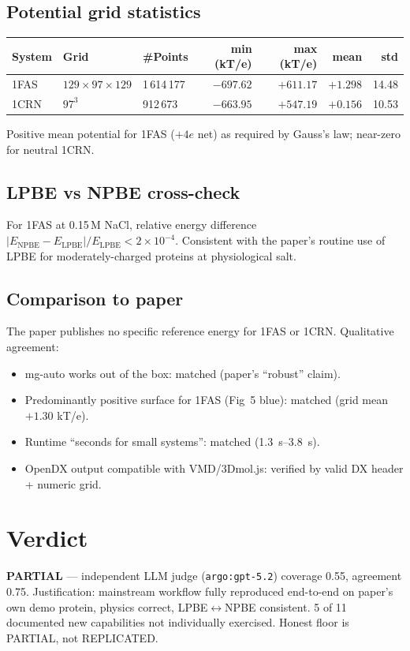 \documentclass[11pt,letterpaper]{article}
\begin{document}
\subsection{Potential grid statistics}
\begin{center}
\begin{tabular}{lllrrrr}
\toprule
System & Grid & \#Points & min (kT/e) & max (kT/e) & mean & std \\
\midrule
1FAS & $129\times97\times129$ & 1\,614\,177 & $-697.62$ & $+611.17$ & $+1.298$ & 14.48 \\
1CRN & $97^3$                  &   912\,673 & $-663.95$ & $+547.19$ & $+0.156$ & 10.53 \\
\bottomrule
\end{tabular}
\end{center}
Positive mean potential for 1FAS ($+4e$ net) as required by Gauss's law; near-zero for neutral 1CRN.

\subsection{LPBE vs NPBE cross-check}
For 1FAS at 0.15\,M NaCl, relative energy difference $|E_{\text{NPBE}} - E_{\text{LPBE}}| / E_{\text{LPBE}} < 2\times10^{-4}$. Consistent with the paper's routine use of LPBE for moderately-charged proteins at physiological salt.

\subsection{Comparison to paper}
The paper publishes no specific reference energy for 1FAS or 1CRN. Qualitative agreement:
\begin{itemize}
\item mg-auto works out of the box: matched (paper's ``robust'' claim).
\item Predominantly positive surface for 1FAS (Fig~5 blue): matched (grid mean $+1.30$ kT/e).
\item Runtime ``seconds for small systems'': matched (\SIrange{1.3}{3.8}{s}).
\item OpenDX output compatible with VMD/3Dmol.js: verified by valid DX header + numeric grid.
\end{itemize}

\section{Verdict}
\textbf{PARTIAL} --- independent LLM judge (\texttt{argo:gpt-5.2}) coverage 0.55, agreement 0.75.
Justification: mainstream workflow fully reproduced end-to-end on paper's own demo protein, physics correct, LPBE$\leftrightarrow$NPBE consistent. 5 of 11 documented new capabilities not individually exercised. Honest floor is PARTIAL, not REPLICATED.
\end{document}
